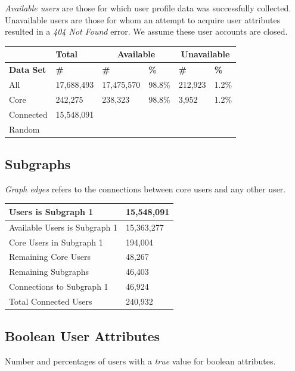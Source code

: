 
\textit{Available users} are those for which user profile data was successfully collected.  Unavailable users are those for whom an attempt to acquire user attributes resulted in a \textit{404 Not Found} error.  We assume these user accounts are closed.\\

\begin{tabular}[t]{| l | l | l | l | l | l |}
\hline
& \textbf{Total} & \multicolumn{2}{|c|}{\textbf{Available}} & \multicolumn{2}{|c|}{\textbf{Unavailable}} \\ \hline
\textbf{Data Set} & \textbf{\#} & \textbf{\#} & \textbf{\%} & \textbf{\#} & \textbf{\%} \\ \hline
All & 17,688,493 & 17,475,570 & 98.8\% & 212,923 & 1.2\% \\ \hline
Core & 242,275 & 238,323 & 98.8\% & 3,952 & 1.2\% \\ \hline
Connected & 15,548,091 & & & & \\ \hline
Random & & & & & \\ \hline
\end{tabular}

\subsection{Subgraphs}
\textit{Graph edges} refers to the connections between core users and any other user.\\

\begin{tabular}{| l | l | }
\hline
Users is Subgraph 1 & 15,548,091 \\ \hline
Available Users is Subgraph 1 & 15,363,277 \\ \hline
Core Users in Subgraph 1  & 194,004 \\ \hline
Remaining Core Users  & 48,267 \\ \hline
Remaining Subgraphs  & 46,403 \\ \hline
Connections to Subgraph 1  & 46,924 \\ \hline
Total Connected Users & 240,932 \\ \hline
\end{tabular}

\subsection{Boolean User Attributes}
Number and percentages of users with a \textit{true} value for boolean attributes.\\

